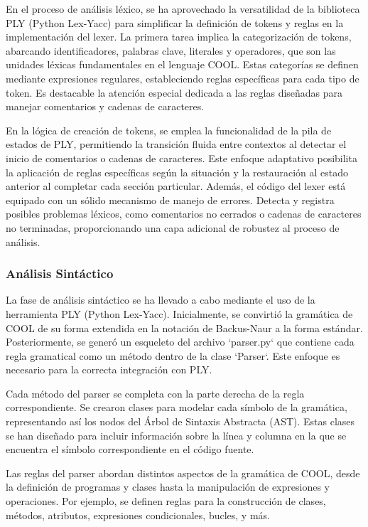 \documentclass[10pt]{article} %
\begin{document}
	En el proceso de análisis léxico, se ha aprovechado la versatilidad de la biblioteca PLY (Python Lex-Yacc) para simplificar la definición de tokens y reglas en la implementación del lexer. La primera tarea implica la categorización de tokens, abarcando identificadores, palabras clave, literales y operadores, que son las unidades léxicas fundamentales en el lenguaje COOL. Estas categorías se definen mediante expresiones regulares, estableciendo reglas específicas para cada tipo de token. Es destacable la atención especial dedicada a las reglas diseñadas para manejar comentarios y cadenas de caracteres.
	
	En la lógica de creación de tokens, se emplea la funcionalidad de la pila de estados de PLY, permitiendo la transición fluida entre contextos al detectar el inicio de comentarios o cadenas de caracteres. Este enfoque adaptativo posibilita la aplicación de reglas específicas según la situación y la restauración al estado anterior al completar cada sección particular. Además, el código del lexer está equipado con un sólido mecanismo de manejo de errores. Detecta y registra posibles problemas léxicos, como comentarios no cerrados o cadenas de caracteres no terminadas, proporcionando una capa adicional de robustez al proceso de análisis.
	
	\subsubsection{An\'alisis Sint\'actico}
	
	La fase de análisis sintáctico se ha llevado a cabo mediante el uso de la herramienta PLY (Python Lex-Yacc). Inicialmente, se convirtió la gramática de COOL de su forma extendida en la notación de Backus-Naur a la forma estándar. Posteriormente, se generó un esqueleto del archivo `parser.py` que contiene cada regla gramatical como un método dentro de la clase `Parser`. Este enfoque es necesario para la correcta integración con PLY.
	
	Cada método del parser se completa con la parte derecha de la regla correspondiente. Se crearon clases para modelar cada símbolo de la gramática, representando así los nodos del Árbol de Sintaxis Abstracta (AST). Estas clases se han diseñado para incluir información sobre la línea y columna en la que se encuentra el símbolo correspondiente en el código fuente.
	
	Las reglas del parser abordan distintos aspectos de la gramática de COOL, desde la definición de programas y clases hasta la manipulación de expresiones y operaciones. Por ejemplo, se definen reglas para la construcción de clases, métodos, atributos, expresiones condicionales, bucles, y más.
	
\end{document}
